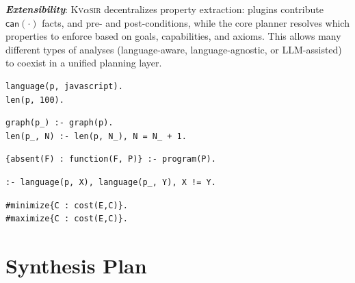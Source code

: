 \documentclass[nonacm,sigplan,review]{acmart}
\newcommand{\sys}{{\scshape Kv{$\alpha$}sir}\xspace}
\newcommand{\heading}[1]{\vspace{2pt}\noindent\textbf{\emph{#1}}:\enspace}
\newcommand{\ttt}[1]{\texttt{#1}\xspace}
\begin{document}
\heading{Extensibility}
\sys decentralizes property extraction: plugins contribute $\mathsf{can}(\cdot)$ facts, and pre- and post-conditions, while the core planner resolves which properties to enforce based on goals, capabilities, and axioms.
This allows many different types of analyses (language-aware, language-agnostic, or LLM-assisted)
to coexist in a unified planning layer.

\begin{listing}
\begin{verbatim}
language(p, javascript).
len(p, 100).
\end{verbatim}
\caption{A set of facts over a program.}
\label{lst:terms}
\end{listing}

\begin{listing}
\begin{verbatim}
graph(p_) :- graph(p).
len(p_, N) :- len(p, N_), N = N_ + 1.
\end{verbatim}
\caption{Logic rules describing relationships between the original and regenerated program.}
\label{lst:rules}
\end{listing}

\begin{listing}
\begin{verbatim}
{absent(F) : function(F, P)} :- program(P).
\end{verbatim}
\caption{A choice rule.}
\label{lst:choice}
\end{listing}

\begin{listing}
\begin{verbatim}
:- language(p, X), language(p_, Y), X != Y.
\end{verbatim}
\caption{An integrity constraint.}
\label{lst:constraint}
\end{listing}

\begin{listing}
\begin{verbatim}
#minimize{C : cost(E,C)}.
#maximize{C : cost(E,C)}.
\end{verbatim}
\caption{Examples of optimization directives. Note that this differs from \sys's \ttt{\#min} or \ttt{\#max} directives, which is used to direct the synthesizer to minimize a program's property but has no effect on the produced answer set.}
\label{lst:optimization}
\end{listing}


\section{Synthesis Plan}
\label{sec:synthesis}
\end{document}
